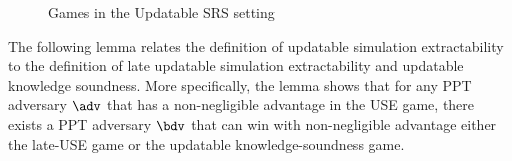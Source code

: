 \begin{figure}[!ht]
\begin{center}
		\begin{minipage}[t]{0.5\linewidth}
		\end{minipage}
		\caption{Games in the Updatable SRS setting} 
		\label{fig:upd}
	\end{center}
\end{figure}

The following lemma relates the definition of updatable simulation extractability to the definition of late updatable simulation extractability and updatable knowledge soundness. More specifically, the lemma shows that for any PPT adversary $\adv$ that has a non-negligible advantage in the USE game, there exists a PPT adversary $\bdv$ that can win with non-negligible advantage either the late-USE game or the updatable knowledge-soundness game.


